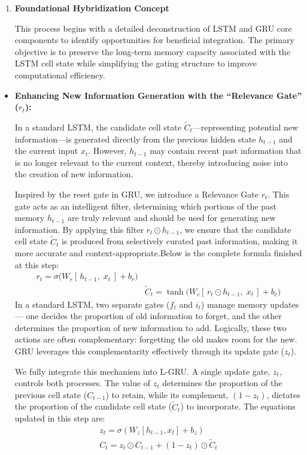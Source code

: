 \documentclass{cys}
\begin{document}
\begin{enumerate}
  \item \textbf{Foundational Hybridization Concept}

  This process begins with a detailed deconstruction of LSTM and GRU core components to identify opportunities for beneficial integration. The primary objective is to preserve the long-term memory capacity associated with the LSTM cell state while simplifying the gating structure to improve computational efficiency.
\end{enumerate}
  \begin{itemize}
    \item \textbf{Enhancing New Information Generation with the ``Relevance Gate'' (\(r_t\)):}

  In a standard LSTM, the candidate cell state \(\tilde{C}_t\)---representing potential new information---is generated directly from the previous hidden state \(h_{t-1}\) and the current input \(x_t\). However, \(h_{t-1}\) may contain recent past information that is no longer relevant to the current context, thereby introducing noise into the creation of new information.

  Inspired by the reset gate in GRU, we introduce a Relevance Gate \(r_t\). This gate acts as an intelligent filter, determining which portions of the past memory \(h_{t-1}\) are truly relevant and should be used for generating new information. By applying this filter \(r_t \odot h_{t-1}\), we ensure that the candidate cell state \(\tilde{C}_t\) is produced from selectively curated past information, making it more accurate and context-appropriate.Below is the complete formula finished at this step:
    \begin{multline}
  r_t = \sigma\!\big( W_r \left[\, h_{t-1},\; x_t \,\right] + b_r \big) \\&
  \tilde{C}_t = \tanh\!\big( W_c \left[\, r_t \odot h_{t-1},\; x_t \,\right] + b_c \big)
   \end{multline}
   In a standard LSTM, two separate gates ($f_t$ and $i_t$) manage memory updates --- 
   one decides the proportion of old information to forget, and the other determines 
   the proportion of new information to add. Logically, these two actions are often 
   complementary: forgetting the old makes room for the new. GRU leverages this 
   complementarity effectively through its update gate ($z_t$).

   We fully integrate this mechanism into L-GRU. A single update gate, $z_t$, 
   controls both processes. The value of $z_t$ determines the proportion of the 
   previous cell state ($C_{t-1}$) to retain, while its complement, $(1 - z_t)$, 
   dictates the proportion of the candidate cell state ($\tilde{C}_t$) to incorporate. 
   The equations updated in this step are:
\begin{multline}
    z_t = \sigma\left(W_z [h_{t-1}, x_t] + b_z\right) \\
    C_t = z_t \odot C_{t-1} + (1 - z_t) \odot \tilde{C}_t
\end{multline}



\end{itemize}
\end{document}
